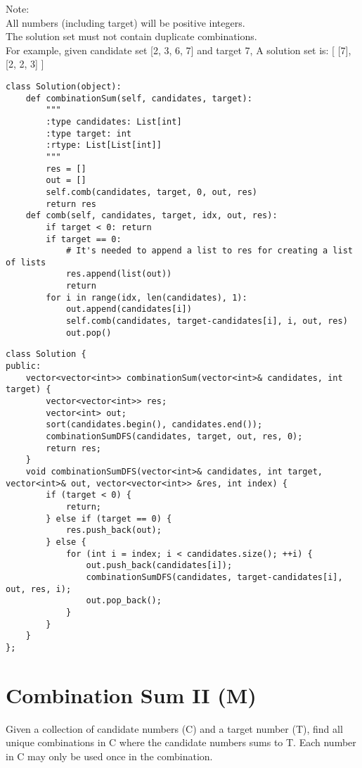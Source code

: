 Note:\\
    All numbers (including target) will be positive integers.\\
    The solution set must not contain duplicate combinations.\\

For example, given candidate set [2, 3, 6, 7] and target 7, A solution set is: [ [7], [2, 2, 3] ]\\

\begin{lstlisting}
class Solution(object):
    def combinationSum(self, candidates, target):
        """
        :type candidates: List[int]
        :type target: int
        :rtype: List[List[int]]
        """
        res = []
        out = []
        self.comb(candidates, target, 0, out, res)
        return res
    def comb(self, candidates, target, idx, out, res):
        if target < 0: return
        if target == 0:
            # It's needed to append a list to res for creating a list of lists
            res.append(list(out)) 
            return
        for i in range(idx, len(candidates), 1):
            out.append(candidates[i])
            self.comb(candidates, target-candidates[i], i, out, res)
            out.pop()
\end{lstlisting}

\begin{lstlisting}
class Solution {
public:
    vector<vector<int>> combinationSum(vector<int>& candidates, int target) {
        vector<vector<int>> res;
        vector<int> out;
        sort(candidates.begin(), candidates.end());
        combinationSumDFS(candidates, target, out, res, 0);
        return res;
    }
    void combinationSumDFS(vector<int>& candidates, int target, vector<int>& out, vector<vector<int>> &res, int index) {
        if (target < 0) {
            return;
        } else if (target == 0) {
            res.push_back(out);
        } else {
            for (int i = index; i < candidates.size(); ++i) {
                out.push_back(candidates[i]);
                combinationSumDFS(candidates, target-candidates[i], out, res, i);
                out.pop_back();
            }
        }
    }
};
\end{lstlisting}


\section{Combination Sum II (M)}
Given a collection of candidate numbers (C) and a target number (T), find all unique combinations in C where the candidate numbers sums to T. Each number in C may only be used once in the combination.\\

